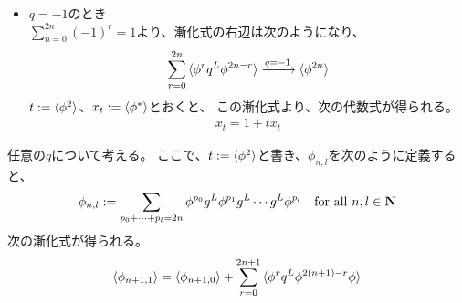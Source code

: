 {\begin{itemize}
		\begin{equation*}\begin{split}
			\sum_{r=0}^{2n}\braket{\phi^rq^L\phi^{2n-r}}
			\xto{q=1} (2n + 1)\braket{\phi^{2n}}
		\end{split}\end{equation*}
		$t:=\braket{\phi^2}$、$x_t:=\braket{\exp\phi}$とおくと、
		この漸化式は次のようになり、
		\begin{equation*}\begin{split}
			x_t = 1 + \sum_{n\in\sizen} \frac{t}{2(n+1)}\braket{\frac{\phi^{2n}}{(2n)!}}
		\end{split}\end{equation*}
		$\braket{\phi^{2n}}\propto t^{2n}$とすると、次の積分方程式が得られる。
		\begin{equation*}\begin{split}
			x_t = 1 + \frac{1}{2}\int_0^tds x_s
		\end{split}\end{equation*}
		\item $q=-1$のとき \\
		$\sum_{n=0}^{2n}(-1)^r=1$より、漸化式の右辺は次のようになり、
		\begin{equation*}\begin{split}
			\sum_{r=0}^{2n}\mathinner{\langle{\phi^rq^L\phi^{2n-r}}\rangle}
			\xrightarrow[{}]{q=-1} \mathinner{\langle{\phi^{2n}}\rangle}
		\end{split}\end{equation*}
		$t:=\braket{\phi^2}$、$x_t:=\mathinner{\langle{\phi^*}\rangle}$とおくと、
		この漸化式より、次の代数式が得られる。
		\begin{equation*}\begin{split}
			x_t = 1 + tx_t
		\end{split}\end{equation*}
	\end{itemize} %
	任意の$q$について考える。
	ここで、$t:=\braket{\phi^2}$と書き、$\phi_{n,l}$を次のように定義すると、
	\begin{equation*}\begin{split}
		\phi_{n,l} := \sum_{p_0+\cdots+p_l=2n}
		\phi^{p_0}g^L\phi^{p_1}g^L\cdots g^L\phi^{p_l}
		\quad\text{for all } n,l\in\mathbf{N}
	\end{split}\end{equation*}
	次の漸化式が得られる。
	\begin{equation*}\begin{split}
		\braket{\phi_{n+1,1}}
		&= \braket{\phi_{n+1,0}}
			+ \sum_{r=0}^{2n+1}\braket{\phi^rq^L\phi^{2(n+1)-r}\phi} \\

\end{split}
\end{equation*}}
